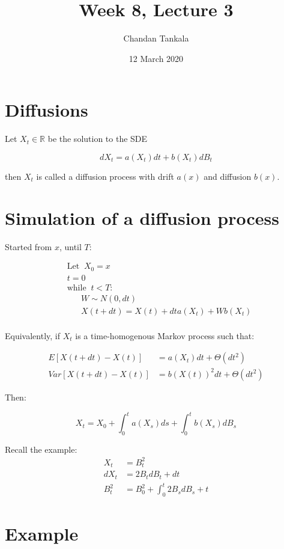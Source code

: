 \documentclass{article}
\title{Week 8, Lecture 3}
\author{Chandan Tankala}
\date{12 March 2020}
\begin{document}
\maketitle
\section{Diffusions}
Let $X_t\in \mathbb{R}$ be the solution to the SDE 

$$dX_t = a(X_t)dt + b(X_t)dB_t$$

then $X_t$ is called a diffusion process with drift $a(x)$ and diffusion $b(x)$.

\section{Simulation of a diffusion process}

Started from $x$, until $T$:

$$
\begin{align}
    &\text{Let}\;\; X_0 = x \\
    & t= 0 \\
    & \text{while}\;\; t<T: \\
    & \;\;\;\;\;\; W\sim N(0,dt) \\
    & \;\;\;\;\;\; X(t+dt) = X(t) + dta(X_t) + Wb(X_t) \\
\end{align}
$$

Equivalently, if $X_t$ is a time-homogenous Markov process such that:

\begin{align}
    E[X(t+dt)-X(t)] &= a(X_t)dt+\Theta(dt^2) \\
    Var[X(t+dt)-X(t)] &= b(X(t))^2dt+\Theta(dt^2)
\end{align}

Then:

$$X_t = X_0 + \int_0^ta(X_s)ds+\int_0^tb(X_s)dB_s$$

Recall the example: \\

\begin{align}
    X_t &= B_t^2 \\
    dX_t &= 2B_tdB_t + dt \\
    B_t^2 &= B_0^2 + \int_0^t 2B_sdB_s + t
\end{align}

\section{Example}
\end{document}
